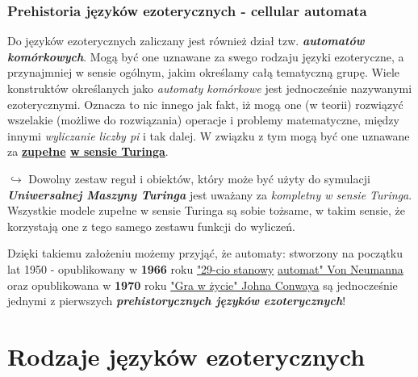 \documentclass[fleqn,10pt]{SelfArx} %
\begin{document}
\subsubsection{Prehistoria języków ezoterycznych - cellular automata}
Do języków ezoterycznych zaliczany jest również dział tzw. \textbf{\textit{automatów komórkowych}}.
Mogą być one uznawane za swego rodzaju języki ezoteryczne, a przynajmniej w sensie ogólnym, jakim określamy całą tematyczną grupę.
Wiele konstruktów określanych jako \textit{automaty komórkowe} jest jednocześnie nazywanymi ezoterycznymi.
Oznacza to nic innego jak fakt, iż mogą one (w teorii) rozwiązyć wszelakie (możliwe do rozwiązania) 
operacje i problemy matematyczne, między innymi \textit{wyliczanie liczby pi} i tak dalej. 
W związku z tym mogą być one uznawane za \textbf{\underline{zupełne} \underline{w sensie Turinga}}.
\begin{adjustwidth}{1cm}{0cm} 
	$\hookrightarrow$ Dowolny zestaw reguł i obiektów, który może być użyty do symulacji \textbf{\textit{Uniwersalnej Maszyny Turinga}}
	jest uważany za \textit{kompletny w sensie Turinga}. Wszystkie modele zupełne w sensie Turinga są sobie tożsame, 
	w takim sensie, że korzystają one z tego samego zestawu funkcji do wyliczeń.\cite{IEEEXplore:TuringCompletnessCivilization}
\end{adjustwidth}
Dzięki takiemu założeniu możemy przyjąć, że automaty: stworzony na początku lat 1950 - opublikowany w \textbf{1966} roku \underline{"29-cio stanowy} \underline{automat" Von Neumanna}
oraz opublikowana w \textbf{1970} roku \underline{"Gra w życie" Johna Conwaya} są jednocześnie jednymi z pierwszych \textbf{\textit{prehistorycznych języków ezoterycznych}}!



\section{Rodzaje języków ezoterycznych \cite{esolangWiki:esolangs}}	%
\end{document}
